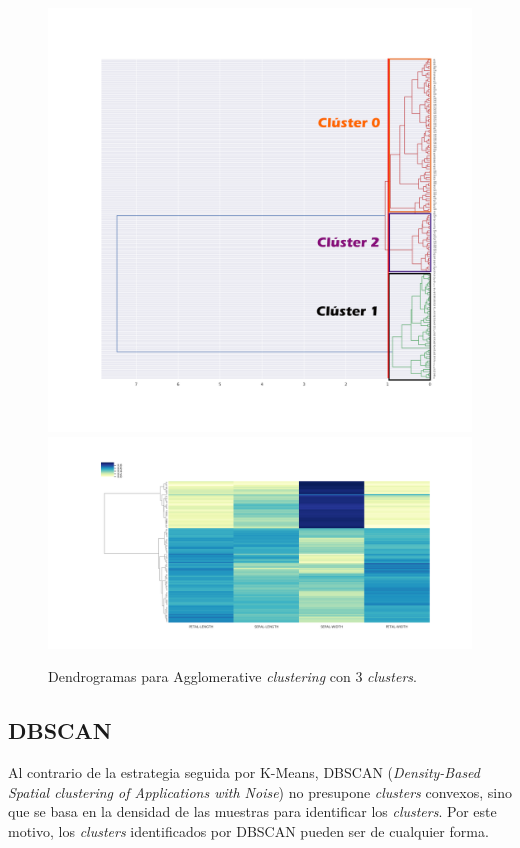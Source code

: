 \documentclass[a4paper, 20pt]{article}
\begin{document}
{\begin{figure}[h]
\centering
\includegraphics[scale=0.35]{dani/dendrogramcolor.png}
\includegraphics[scale=0.35]{dani/dendscatAggClusterIRIS.png}
\caption{Dendrogramas para Agglomerative \textit{clustering} con 3 \textit{clusters}.}
\label{dac}
\end{figure}

\clearpage

\subsection{DBSCAN}

Al contrario de la estrategia seguida por K-Means, DBSCAN (\textit{Density-Based Spatial \textit{clustering} of Applications with Noise}) no presupone \textit{clusters} convexos, sino que se basa en la densidad de las muestras para identificar los \textit{clusters}. Por este motivo, los \textit{clusters} identificados por DBSCAN pueden ser de cualquier forma.\\

}
\end{document}
